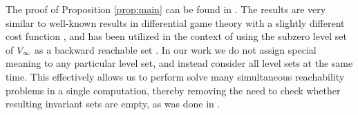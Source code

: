  \begin{rem} 
   The proof of Proposition \ref{prop:main} can be found in \cite{ChenThesis}. The results are very similar to well-known results in differential game theory with a slightly different cost function \cite{Akametalu2014}, and has been utilized in the context of using the subzero level set of $V_\infty$ as a backward reachable set \cite{Mitchell05}. In our work we do not assign special meaning to any particular level set, and instead consider all level sets at the same time. This effectively allows us to perform solve many simultaneous reachability problems in a single computation, thereby removing the need to check whether resulting invariant sets are empty, as was done in \cite{Bansal2017}.
 \end{rem}
